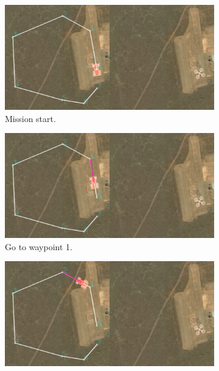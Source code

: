 \begin{figure}
  \centering
  \begin{subfigure}[b]{0.9\columnwidth}
    \includegraphics[width=\textwidth]{img/mission1.png}
    \caption{Mission start.}
  \end{subfigure}
  \begin{subfigure}[b]{0.9\columnwidth}
    \includegraphics[width=\textwidth]{img/mission2.png}
    \caption{Go to waypoint 1.}
  \end{subfigure}
  \begin{subfigure}[b]{0.9\columnwidth}
    \includegraphics[width=\textwidth]{img/mission3.png}

\end{subfigure}
\end{figure}
